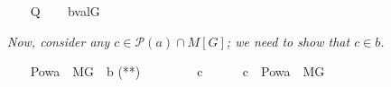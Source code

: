 \begin{isabelle}
\ \ \isamarkupfalse%
\ {\isacharquery}{\kern0pt}{\isasympi}{\isacharequal}{\kern0pt}{\isachardoublequoteopen}{\isacharquery}{\kern0pt}Q{\isasymtimes}{\isacharbraceleft}{\kern0pt}{\isasymone}{\isacharbraceright}{\kern0pt}{\isachardoublequoteclose}\isanewline
\ \ \isamarkupfalse%
\ {\isacharquery}{\kern0pt}b{\isacharequal}{\kern0pt}{\isachardoublequoteopen}val{\isacharparenleft}{\kern0pt}G{\isacharcomma}{\kern0pt}{\isacharquery}{\kern0pt}{\isasympi}{\isacharparenright}{\kern0pt}{\isachardoublequoteclose}%
\end{isabelle}
\textit{Now,
  consider any $c \in \mathcal{P}(a) \cap M[G]$; we need to show that
  $c \in b$.}
\begin{isabelle}
  \label{goal-on-b}
\ \ \isamarkupfalse%
\ {\isachardoublequoteopen}Pow{\isacharparenleft}{\kern0pt}a{\isacharparenright}{\kern0pt}\ {\isasyminter}\ M{\isacharbrackleft}{\kern0pt}G{\isacharbrackright}{\kern0pt}\ {\isasymsubseteq}\ {\isacharquery}{\kern0pt}b{\isachardoublequoteclose}\hfill
\mbox{\rm\small(**)}\isanewline
\ \ \isamarkupfalse%
\isanewline
\ \ \ \ \isamarkupfalse%
\ c\isanewline
\ \ \ \ \isamarkupfalse%
\ {\isachardoublequoteopen}c\ {\isasymin}\ Pow{\isacharparenleft}{\kern0pt}a{\isacharparenright}{\kern0pt}\ {\isasyminter}\ M{\isacharbrackleft}{\kern0pt}G{\isacharbrackright}{\kern0pt}{\isachardoublequoteclose}
\end{isabelle}
